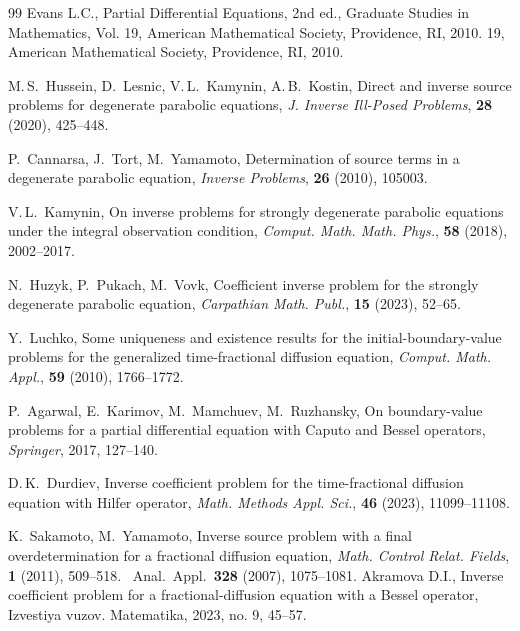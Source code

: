 \documentclass[reqno]{amsart}
\theoremstyle{definition}
\numberwithin{equation}{section}
\begin{document}
\begin{thebibliography}{99}
Evans L.C., Partial Differential Equations, 2nd ed., Graduate Studies in Mathematics, Vol. 19, American Mathematical Society, Providence, RI, 2010. 19, American Mathematical Society, Providence, RI, 2010.

 M.\,S.~Hussein, D.~Lesnic, V.\,L.~Kamynin, A.\,B.~Kostin,
   Direct and inverse source problems for degenerate parabolic equations,
   \textit{J. Inverse Ill-Posed Problems}, \textbf{28} (2020), 425--448.

  P.~Cannarsa, J.~Tort, M.~Yamamoto,
   Determination of source terms in a degenerate parabolic equation,
   \textit{Inverse Problems}, \textbf{26} (2010), 105003.

  V.\,L.~Kamynin,
   On inverse problems for strongly degenerate parabolic equations
   under the integral observation condition,
   \textit{Comput. Math. Math. Phys.}, \textbf{58} (2018), 2002--2017.

  N.~Huzyk, P.~Pukach, M.~Vovk,
   Coefficient inverse problem for the strongly degenerate parabolic equation,
   \textit{Carpathian Math. Publ.}, \textbf{15} (2023), 52--65.

  Y.~Luchko,
   Some uniqueness and existence results for the initial-boundary-value problems
   for the generalized time-fractional diffusion equation,
   \textit{Comput. Math. Appl.}, \textbf{59} (2010), 1766--1772.

  P.~Agarwal, E.~Karimov, M.~Mamchuev, M.~Ruzhansky,
   On boundary-value problems for a partial differential equation
   with Caputo and Bessel operators,
   \textit{Springer}, 2017, 127--140.

  D.\,K.~Durdiev,
   Inverse coefficient problem for the time-fractional diffusion equation
   with Hilfer operator,
   \textit{Math. Methods Appl. Sci.}, \textbf{46} (2023), 11099--11108.

  K.~Sakamoto, M.~Yamamoto,
   Inverse source problem with a final overdetermination for a fractional
   diffusion equation,
   \textit{Math. Control Relat. Fields}, \textbf{1} (2011), 509--518.
\ Anal.\ Appl.\ \textbf{328} (2007), 1075--1081.
Akramova D.I., Inverse coefficient problem for a fractional-diffusion equation with a Bessel operator, Izvestiya vuzov. Matematika, 2023, no. 9, 45–57.
\end{thebibliography}



\label{lastpage}


%
\end{document}
